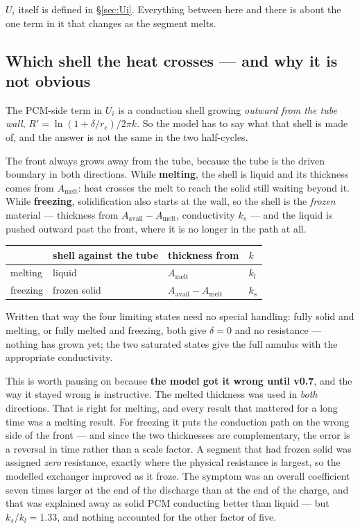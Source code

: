 \documentclass[11pt,a4paper]{article}
\newcommand{\Ui}{\ensuremath{U_{i}}}
\newcommand{\Aav}{\ensuremath{A_{\mathrm{avail}}}}
\newcommand{\Amelt}{\ensuremath{A_{\mathrm{melt}}}}
\begin{document}
$\Ui$ itself is defined in \S\ref{sec:Ui}. Everything between here and there is
about the one term in it that changes as the segment melts.

\subsection{Which shell the heat crosses --- and why it is not obvious}
\label{sec:shell-primer}

The PCM-side term in $\Ui$ is a conduction shell growing \emph{outward from the
tube wall}, $R'=\ln(1+\delta/r_e)/2\pi k$. So the model has to say what that
shell is made of, and the answer is not the same in the two half-cycles.

The front always grows away from the tube, because the tube is the driven
boundary in both directions. While \textbf{melting}, the shell is liquid and its
thickness comes from $\Amelt$: heat crosses the melt to reach the solid still
waiting beyond it. While \textbf{freezing}, solidification also starts at the
wall, so the shell is the \emph{frozen} material --- thickness from
$\Aav-\Amelt$, conductivity $k_s$ --- and the liquid is pushed outward past the
front, where it is no longer in the path at all.

\begin{center}
\begin{tabular}{@{}l l l l@{}}
\toprule
 & shell against the tube & thickness from & $k$ \\
\midrule
melting  & liquid       & $\Amelt$      & $k_l$ \\
freezing & frozen solid & $\Aav-\Amelt$ & $k_s$ \\
\bottomrule
\end{tabular}
\end{center}

\noindent
Written that way the four limiting states need no special handling: fully solid
and melting, or fully melted and freezing, both give $\delta=0$ and no
resistance --- nothing has grown yet; the two saturated states give the full
annulus with the appropriate conductivity.

This is worth pausing on because \textbf{the model got it wrong until v0.7}, and
the way it stayed wrong is instructive. The melted thickness was used in
\emph{both} directions. That is right for melting, and every result that
mattered for a long time was a melting result. For freezing it puts the
conduction path on the wrong side of the front --- and since the two thicknesses
are complementary, the error is a reversal in time rather than a scale factor. A
segment that had frozen solid was assigned \emph{zero} resistance, exactly where
the physical resistance is largest, so the modelled exchanger improved as it
froze. The symptom was an overall coefficient seven times larger at the end of
the discharge than at the end of the charge, and that was explained away as
solid PCM conducting better than liquid --- but $k_s/k_l=1.33$, and nothing
accounted for the other factor of five.
\end{document}

